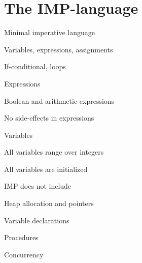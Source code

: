 \section{The IMP-language}
\enumstart
	\item Minimal imperative language
	\enumstart
		\item Variables, expressions, assignments
		\item If-conditional, loops
	\enumend
	\item Expressions
	\enumstart
		\item Boolean and arithmetic expressions
		\item No side-effects in expressions
	\enumend
	\item Variables
	\enumstart
		\item All variables range over integers
		\item All variables are initialized
	\enumend
	\item IMP does not include
	\enumstart
		\item Heap allocation and pointers
		\item Variable declarations
		\item Procedures
		\item Concurrency
	\enumend
\enumend

